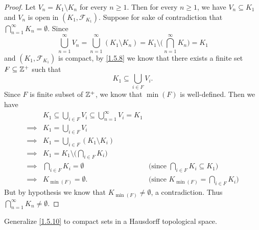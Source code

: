 \begin{proof}
  Let \(V_n = K_1 \setminus K_n\) for every \(n \geq 1\).
  Then for every \(n \geq 1\), we have \(V_n \subseteq K_1\) and \(V_n\) is open in \((K_1, \mathcal{F}_{K_1})\).
  Suppose for sake of contradiction that \(\bigcap_{n = 1}^\infty K_n = \emptyset\).
  Since
  \[
    \bigcup_{n = 1}^\infty V_n = \bigcup_{n = 1}^\infty (K_1 \setminus K_n) = K_1 \setminus \bigg(\bigcap_{n = 1}^\infty K_n\bigg) = K_1
  \]
  and \((K_1, \mathcal{F}_{K_1})\) is compact, by \cref{1.5.8} we know that there exists a finite set \(F \subseteq \mathbb{Z}^+\) such that
  \[
    K_1 \subseteq \bigcup_{i \in F} V_i.
  \]
  Since \(F\) is finite subset of \(\mathbb{Z}^+\), we know that \(\min(F)\) is well-defined.
  Then we have
  \begin{align*}
             & K_1 \subseteq \bigcup_{i \in F} V_i \subseteq \bigcup_{n = 1}^\infty V_i = K_1                                                          \\
    \implies & K_1 = \bigcup_{i \in F} V_i                                                                                                             \\
    \implies & K_1 = \bigcup_{i \in F} (K_1 \setminus K_i)                                                                                             \\
    \implies & K_1 = K_1 \setminus \bigg(\bigcap_{i \in F} K_i\bigg)                                                                                   \\
    \implies & \bigcap_{i \in F} K_i = \emptyset                                              & \text{(since \(\bigcap_{i \in F} K_i \subseteq K_1)\)} \\
    \implies & K_{\min(F)} = \emptyset.                                                       & \text{(since \(K_{\min(F)} = \bigcap_{i \in F} K_i)\)}
  \end{align*}
  But by hypothesis we know that \(K_{\min(F)} \neq \emptyset\), a contradiction.
  Thus \(\bigcap_{n = 1}^\infty K_n \neq \emptyset\).
\end{proof}

\begin{ex}\label{ex:2.5.14}
  Generalize \cref{1.5.10} to compact sets in a Hausdorff topological space.
\end{ex}

